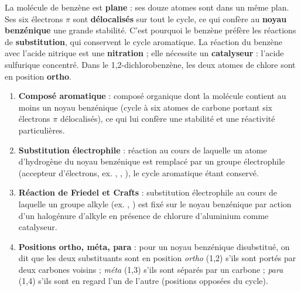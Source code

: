 \documentclass[11pt]{article}
\newcommand{\cle}[1]{{\popxbold\color{popdark}#1}}
\begin{document}
\begin{corrige}
La molécule de benzène est \textbf{plane} : ses douze atomes sont dans un même plan. Ses six électrons $\pi$ sont \textbf{délocalisés} sur tout le cycle, ce qui confère au \textbf{noyau benzénique} une grande stabilité. C'est pourquoi le benzène préfère les réactions de \textbf{substitution}, qui conservent le cycle aromatique. La réaction du benzène avec l'acide nitrique est une \textbf{nitration} ; elle nécessite un \textbf{catalyseur} : l'acide sulfurique concentré. Dans le 1,2-dichlorobenzène, les deux atomes de chlore sont en position \textbf{ortho}.
\end{corrige}

\begin{corrige}
\begin{enumerate}
\item \textbf{Composé aromatique} : composé organique dont la molécule contient au moins un \cle{noyau benzénique} (cycle à six atomes de carbone portant six électrons $\pi$ délocalisés), ce qui lui confère une stabilité et une réactivité particulières.
\item \textbf{Substitution électrophile} : réaction au cours de laquelle un atome d'hydrogène du noyau benzénique est remplacé par un groupe électrophile (accepteur d'électrons, ex. , , ), le cycle aromatique étant conservé.
\item \textbf{Réaction de Friedel et Crafts} : substitution électrophile au cours de laquelle un groupe alkyle (ex. , ) est fixé sur le noyau benzénique par action d'un halogénure d'alkyle  en présence de chlorure d'aluminium  comme catalyseur.
\item \textbf{Positions ortho, méta, para} : pour un noyau benzénique disubstitué, on dit que les deux substituants sont en position \emph{ortho} (1,2) s'ils sont portés par deux carbones voisins ; \emph{méta} (1,3) s'ils sont séparés par un carbone ; \emph{para} (1,4) s'ils sont en regard l'un de l'autre (positions opposées du cycle).
\end{enumerate}
\end{corrige}
\end{document}
